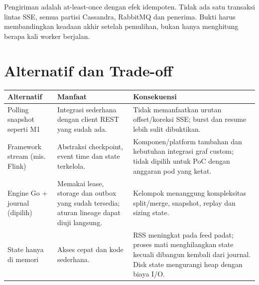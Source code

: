 Pengiriman adalah at-least-once dengan efek idempoten. Tidak ada satu transaksi lintas SSE, semua partisi Cassandra, RabbitMQ dan penerima. Bukti harus membandingkan keadaan akhir setelah pemulihan, bukan hanya menghitung berapa kali worker berjalan.

\section{Alternatif dan Trade-off}
\begin{longtable}{@{}P{3.5cm}P{5.7cm}P{6.3cm}@{}}
\toprule Alternatif & Manfaat & Konsekuensi\\\midrule\endhead
Polling snapshot seperti M1 & Integrasi sederhana dengan client REST yang sudah ada. & Tidak memanfaatkan urutan offset/koreksi SSE; burst dan resume lebih sulit dibuktikan.\\
Framework stream (mis. Flink) & Abstraksi checkpoint, event time dan state terkelola. & Komponen/platform tambahan dan kebutuhan integrasi graf custom; tidak dipilih untuk PoC dengan anggaran pod yang ketat.\\
Engine Go + journal (dipilih) & Memakai lease, storage dan outbox yang sudah tersedia; aturan lineage dapat diuji langsung. & Kelompok menanggung kompleksitas split/merge, snapshot, replay dan sizing state.\\
State hanya di memori & Akses cepat dan kode sederhana. & RSS meningkat pada feed padat; proses mati menghilangkan state kecuali dibangun kembali dari journal. Disk state mengurangi heap dengan biaya I/O.\\\bottomrule
\end{longtable}

